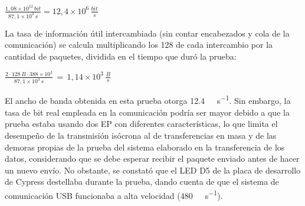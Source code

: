 \begin{center}
	\begin{math}
		\frac{\displaystyle 1,08\times 10^{12}\,bit}{\displaystyle 87,1 \times 10^3\,s}= 12,4 \times 10^6\,\frac{\displaystyle bit}{\displaystyle s}
	\end{math}
\end{center}

La tasa de información útil intercambiada (sin contar encabezados y cola de la comunicación) se calcula multiplicando los \SI{128}{\byte} de cada intercambio por la cantidad de paquetes, dividida en el tiempo que duró la prueba:

\begin{center}
	\begin{math}
		\frac{\displaystyle 2 \cdot 128 \, B \cdot 388 \times 10^3}{\displaystyle 87,1 \times 10^3\,s}\, = \, 1,14\times 10^3\,\frac{\displaystyle B}{\displaystyle s}
	\end{math}
\end{center}

El ancho de banda obtenida en esta prueba otorga \SI{12,4}{\mega\bit\per\second}. Sin embargo, la tasa de bit real empleada en la comunicación podría ser mayor debido a que la prueba estaba usando dos EP con diferentes características, lo que limita el desempeño de la transmisión isócrona al de transferencias en masa y de las demoras propias de la prueba del sistema elaborado en la transferencia de los datos, considerando que se debe esperar recibir el paquete enviado antes de hacer un nuevo envío. No obstante, se constató que el LED D5 de la placa de desarrollo de Cypress destellaba durante la prueba, dando cuenta de que el sistema de comunicación USB funcionaba a alta velocidad (\SI{480}{\mega\bit\per\second}).

